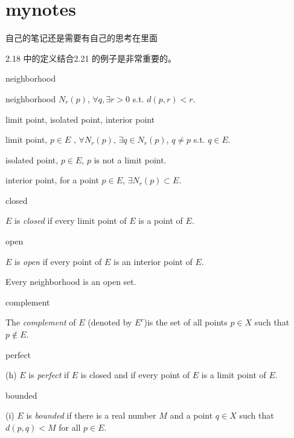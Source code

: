 \section*{mynotes}
自己的笔记还是需要有自己的思考在里面

2.18 中的定义结合2.21 的例子是非常重要的。

\begin{myDef}neighborhood

    neighborhood $N_r(p)$, $\forall q, \exists r>0$ s.t. $d(p,r)<r$.
\end{myDef}

\begin{myDef}limit point, isolated point, interior point

    limit point, $p\in E$ , $\forall N_r(p)$, $\exists q\in N_r(p)$, $q\neq p$ s.t. $q\in E$.

    isolated point, $p\in E$, $p$ is not a limit point.

    interior point, for a point $p \in E$, $\exists N_r(p)\subset E$.
\end{myDef}

\begin{myDef} closed

    $E$ is \emph{closed} if every limit point of $E$ is a point of $E$.
\end{myDef}

\begin{myDef} open

    $E$ is \emph{open} if every point of $E$ is an interior point of $E$.
\end{myDef}

\begin{mynewthm}
    Every neighborhood is an open set.
\end{mynewthm}

\begin{myDef} complement
    
    The \emph{complement} of $E$ (denoted by $E^c$)is the set of all points $p \in X$ such that $p \not\in E$.
\end{myDef}

\begin{myDef} perfect
    
    (h) $E$ is \emph{perfect} if $E$ is closed and if every point of $E$ is a limit point of $E$.
\end{myDef}
    
\begin{myDef} bounded
    
    (i) $E$ is \emph{bounded} if there is a real number $M$ and a point $q \in X$ such that $d(p,q)< M$ for all $p \in E$.
\end{myDef}    


